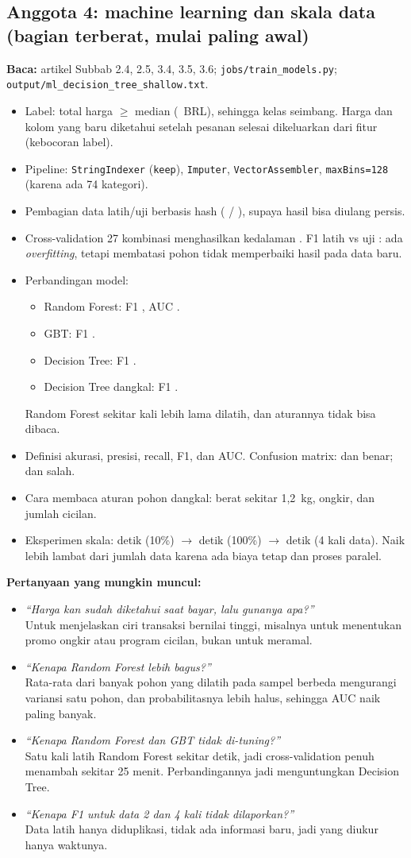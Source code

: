 \documentclass[11pt,a4paper]{article}
\newcommand{\f}[1]{\texttt{#1}}
\newcommand{\tanya}[2]{\item \textit{``#1''}\\ #2}
\begin{document}
\subsection{Anggota 4: machine learning dan skala data (bagian terberat, mulai paling awal)}
\textbf{Baca:} artikel Subbab 2.4, 2.5, 3.4, 3.5, 3.6; \f{jobs/train\_models.py};
\f{output/ml\_decision\_tree\_shallow.txt}.
\begin{itemize}
\item Label: total harga $\geq$ median (\ambang{}~BRL), sehingga kelas seimbang. Harga dan
  kolom yang baru diketahui setelah pesanan selesai dikeluarkan dari fitur (kebocoran
  label).
\item Pipeline: \f{StringIndexer} (\f{keep}), \f{Imputer}, \f{VectorAssembler},
  \f{maxBins=128} (karena ada 74 kategori).
\item Pembagian data latih/uji berbasis hash (\nLatih{} / \nUji{}), supaya hasil bisa
  diulang persis.
\item Cross-validation 27 kombinasi menghasilkan kedalaman \dtDepth. F1 latih
  \dtTrainFone{} vs uji \dtFone: ada \emph{overfitting}, tetapi membatasi pohon tidak
  memperbaiki hasil pada data baru.
\item Perbandingan model:
  \begin{itemize}
  \item Random Forest: F1 \rfFone, AUC \rfAuc.
  \item GBT: F1 \gbtFone.
  \item Decision Tree: F1 \dtFone.
  \item Decision Tree dangkal: F1 \dtdFone.
  \end{itemize}
  Random Forest sekitar \rfTimesSlower{} kali lebih lama dilatih, dan aturannya tidak bisa
  dibaca.
\item Definisi akurasi, presisi, recall, F1, dan AUC. Confusion matrix: \cmTT{} dan
  \cmRR{} benar; \cmTR{} dan \cmRT{} salah.
\item Cara membaca aturan pohon dangkal: berat sekitar 1,2~kg, ongkir, dan jumlah cicilan.
\item Eksperimen skala: \scaleTimeMin{} detik (10\%) $\rightarrow$ \scaleTimeFull{} detik
  (100\%) $\rightarrow$ \scaleTimeMax{} detik (4 kali data). Naik lebih lambat dari jumlah
  data karena ada biaya tetap dan proses paralel.
\end{itemize}
\textbf{Pertanyaan yang mungkin muncul:}
\begin{itemize}
\tanya{Harga kan sudah diketahui saat bayar, lalu gunanya apa?}{Untuk menjelaskan ciri
  transaksi bernilai tinggi, misalnya untuk menentukan promo ongkir atau program cicilan,
  bukan untuk meramal.}
\tanya{Kenapa Random Forest lebih bagus?}{Rata-rata dari banyak pohon yang dilatih pada
  sampel berbeda mengurangi variansi satu pohon, dan probabilitasnya lebih halus, sehingga
  AUC naik paling banyak.}
\tanya{Kenapa Random Forest dan GBT tidak di-tuning?}{Satu kali latih Random Forest sekitar
  \rfFit{} detik, jadi cross-validation penuh menambah sekitar 25 menit. Perbandingannya
  jadi menguntungkan Decision Tree.}
\tanya{Kenapa F1 untuk data 2 dan 4 kali tidak dilaporkan?}{Data latih hanya diduplikasi,
  tidak ada informasi baru, jadi yang diukur hanya waktunya.}
\end{itemize}
\end{document}
